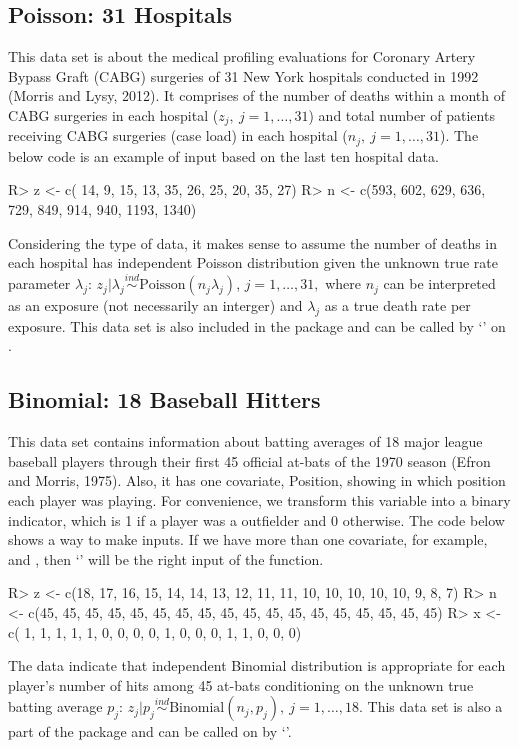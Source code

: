 \documentclass[article]{jss}
\begin{document}
\subsection{Poisson: 31 Hospitals}
This data set is about the medical profiling evaluations for Coronary Artery Bypass Graft (CABG) surgeries of 31 New York hospitals conducted in 1992 (Morris and Lysy, 2012). It comprises of the number of deaths within a month of CABG surgeries in each hospital ($z_{j},~j=1, \ldots, 31$) and total number of patients receiving CABG surgeries (case load) in each hospital ($n_{j},~j=1, \ldots, 31$). The below code is an example of input based on the last ten hospital data.
\begin{CodeChunk}
\begin{CodeInput}
R> z <- c( 14,   9,  15,  13,  35,  26,  25,  20,   35,   27)
R> n <- c(593, 602, 629, 636, 729, 849, 914, 940, 1193, 1340)
\end{CodeInput}
\end{CodeChunk}


Considering the type of data, it makes sense to assume the number of deaths in each hospital has independent Poisson distribution given the unknown true rate parameter $\lambda_{j}$: $z_{j}\vert \lambda_{j}\stackrel{ind}{\sim} \textrm{Poisson}(n_{j}\lambda_{j})$, $j=1, \ldots, 31,$ where $n_{j}$ can be interpreted as an exposure (not necessarily an interger) and $\lambda_{j}$ as a true death rate per exposure. This data set is also included in the package and can be called by `' on .

\subsection{Binomial: 18 Baseball Hitters}
This data set contains information about batting averages of 18 major league baseball players through their first 45 official at-bats of the 1970 season (Efron and Morris, 1975). Also, it has one covariate, Position, showing in which position each player was playing. For convenience, we transform this variable into a binary indicator, which is 1 if a player was a outfielder and 0 otherwise. The code below shows a way to make inputs. If we have more than one covariate, for example,  and , then `' will be the right input of the  function.
\begin{CodeChunk}
\begin{CodeInput}
R> z <- c(18, 17, 16, 15, 14, 14, 13, 12, 11, 11, 10, 10, 10, 10, 10,  9,  8,  7)
R> n <- c(45, 45, 45, 45, 45, 45, 45, 45, 45, 45, 45, 45, 45, 45, 45, 45, 45, 45)
R> x <- c( 1,  1,  1,  1,  1,  0,  0,  0,  0,  1,  0,  0,  0,  1,  1,  0,  0,  0) 
\end{CodeInput}
\end{CodeChunk}
The data indicate that independent Binomial distribution is appropriate for each player's number of hits among 45 at-bats conditioning on the unknown true batting average $p_{j}$: $z_{j}\vert p_{j}\stackrel{ind}{\sim} \textrm{Binomial}(n_{j}, p_{j}), ~j=1, \ldots, 18$. This data set is also a part of the package and can be called on  by `'.
\end{document}
